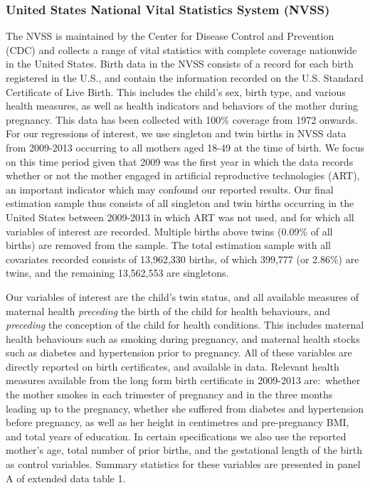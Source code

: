 \documentclass{nature}
\begin{document}
\begin{linenumbers}
\subsubsection{United States National Vital Statistics System (NVSS)}
The NVSS is maintained by the Center for Disease Control and Prevention (CDC) and collects a range of vital statistics with complete coverage nationwide in the United States. Birth data in the NVSS consists of a record for each birth registered in the U.S., and contain the information recorded on the U.S. Standard Certificate of Live Birth.  This includes the child's sex, birth type, and various health measures, as well as health indicators and behaviors of the mother during pregnancy.  This data has been collected with 100\% coverage from 1972 onwards.  For our regressions of interest, we use singleton and twin births in NVSS data from 2009-2013\cite{Martinetal2013} occurring to all mothers aged 18-49 at the time of birth.  We focus on this time period given that 2009 was the first year in which the data records whether or not the mother engaged in artificial reproductive technologies (ART), an important indicator which may confound our reported results.  Our final estimation sample thus consists of all singleton and twin births occurring in the United States between 2009-2013 in which ART was not used, and for which all variables of interest are recorded.  Multiple births above twins (0.09\% of all births) are removed from the sample.  The total estimation sample with all covariates recorded consists of 13,962,330 births, of which 399,777 (or 2.86\%) are twins, and the remaining 13,562,553 are singletons.

Our variables of interest are the child's twin status, and all available measures of maternal health \emph{preceding} the birth of the child for health behaviours, and \emph{preceding} the conception of the child for health conditions.  This includes maternal health behaviours such as smoking during pregnancy, and maternal health stocks such as diabetes and hypertension prior to pregnancy.  All of these variables are directly reported on birth certificates, and available in data.  Relevant health measures available from the long form birth certificate in 2009-2013 are:\ whether the mother smokes in each trimester of pregnancy and in the three months leading up to the pregnancy, whether she suffered from diabetes and hypertension before pregnancy, as well as her height in centimetres and pre-pregnancy BMI, and total years of education.  In certain specifications we also use the reported mother's age, total number of prior births, and the gestational length of the birth as control variables\cite{Hall2003,Hoekstraetal2008}.  Summary statistics for these variables are presented in panel A of extended data table 1.


\end{linenumbers}
\end{document}
